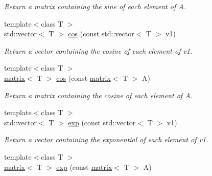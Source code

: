 \begin{DoxyCompactItemize}
\begin{DoxyCompactList}\small\item\em Return a matrix containing the sine of each element of A. \end{DoxyCompactList}\item 
\hypertarget{namespacekeycpp_afaf5c65950c36d6a10e2fc42cae7b041}{{\footnotesize template$<$class T $>$ }\\std\-::vector$<$ T $>$ \hyperlink{namespacekeycpp_afaf5c65950c36d6a10e2fc42cae7b041}{cos} (const std\-::vector$<$ T $>$ v1)}\label{namespacekeycpp_afaf5c65950c36d6a10e2fc42cae7b041}

\begin{DoxyCompactList}\small\item\em Return a vector containing the cosine of each element of v1. \end{DoxyCompactList}\item 
\hypertarget{namespacekeycpp_a6d906ad1b0afbefd588c619cdb02530a}{{\footnotesize template$<$class T $>$ }\\\hyperlink{classkeycpp_1_1matrix}{matrix}$<$ T $>$ \hyperlink{namespacekeycpp_a6d906ad1b0afbefd588c619cdb02530a}{cos} (const \hyperlink{classkeycpp_1_1matrix}{matrix}$<$ T $>$ A)}\label{namespacekeycpp_a6d906ad1b0afbefd588c619cdb02530a}

\begin{DoxyCompactList}\small\item\em Return a matrix containing the cosine of each element of A. \end{DoxyCompactList}\item 
\hypertarget{namespacekeycpp_aa2d4f2ab79da4b10e9be3af2693904ef}{{\footnotesize template$<$class T $>$ }\\std\-::vector$<$ T $>$ \hyperlink{namespacekeycpp_aa2d4f2ab79da4b10e9be3af2693904ef}{exp} (const std\-::vector$<$ T $>$ v1)}\label{namespacekeycpp_aa2d4f2ab79da4b10e9be3af2693904ef}

\begin{DoxyCompactList}\small\item\em Return a vector containing the exponential of each element of v1. \end{DoxyCompactList}\item 
\hypertarget{namespacekeycpp_a24ac535f72f9e72bf2d0fb93b2b0ee01}{{\footnotesize template$<$class T $>$ }\\\hyperlink{classkeycpp_1_1matrix}{matrix}$<$ T $>$ \hyperlink{namespacekeycpp_a24ac535f72f9e72bf2d0fb93b2b0ee01}{exp} (const \hyperlink{classkeycpp_1_1matrix}{matrix}$<$ T $>$ A)}\label{namespacekeycpp_a24ac535f72f9e72bf2d0fb93b2b0ee01}


\end{DoxyCompactItemize}
